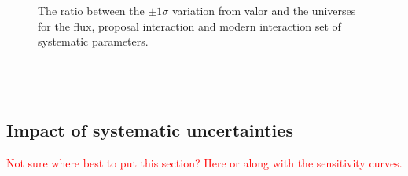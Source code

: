 \begin{figure}[h!]
    \vspace{0.1\textwidth}
  \captionsetup{width=0.45\textwidth}
  \parbox[b]{0.45\textwidth}%
  {
   \caption[The ratio between the $\pm 1 \sigma$ variation from \gls{valor} and the universes for the flux, proposal interaction and modern interaction set of systematics.]{The ratio between the $\pm 1 \sigma$ variation from \gls{valor} and the universes for the flux, proposal interaction and modern interaction set of systematic parameters.  \\\phantom{.}\\\phantom{.}\\\phantom{.}\\
   \label{fig:1sigma_variations_toys}}
  }
\end{figure}

\clearpage
\subsection{Impact of systematic uncertainties}

\textcolor{red}{Not sure where best to put this section? Here or along with the sensitivity curves.}

